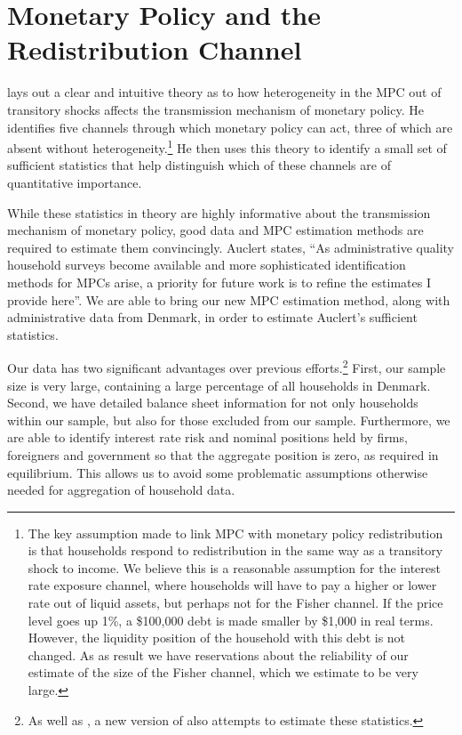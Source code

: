 \documentclass[titlepage]{\econtex}\newcommand{\texname}{ConsumptionHeterogeneity}
\begin{document}
\section{Monetary Policy and the Redistribution Channel} \label{monetary_policy}
\cite{auclert_monetary_2017} lays out a clear and intuitive theory as to how heterogeneity in the MPC out of transitory shocks affects the transmission mechanism of monetary policy. He identifies five channels through which monetary policy can act, three of which are absent without heterogeneity.\footnote{The key assumption made to link MPC with monetary policy redistribution is that households respond to redistribution in the same way as a transitory shock to income. We believe this is a reasonable assumption for the interest rate exposure channel, where households will have to pay a higher or lower rate out of liquid assets, but perhaps not for the Fisher channel. If the price level goes up 1\%, a \$100,000 debt is made smaller by \$1,000 in real terms. However, the liquidity position of the household with this debt is not changed. As as result we have reservations about the reliability of our estimate of the size of the Fisher channel, which we estimate to be very large.} He then uses this theory to identify a small set of sufficient statistics that help distinguish which of these channels are of quantitative importance.

While these statistics in theory are highly informative about the transmission mechanism of monetary policy, good data and MPC estimation methods are required to estimate them convincingly. Auclert states, ``As administrative quality household surveys become available and more sophisticated identification methods for MPCs arise, a priority for future work is to refine the estimates I provide here''. We are able to bring our new MPC estimation method, along with administrative data from Denmark, in order to estimate Auclert's sufficient statistics.

Our data has two significant advantages over previous efforts.\footnote{As well as \cite{auclert_monetary_2017}, a new version of \cite{fagereng_mpc_2016} also attempts to estimate these statistics.} First, our sample size is very large, containing a large percentage of all households in Denmark. Second, we have detailed balance sheet information for not only households within our sample, but also for those excluded from our sample. Furthermore, we are able to identify interest rate risk and nominal positions held by firms, foreigners and government so that the aggregate position is zero, as required in equilibrium. This allows us to avoid some problematic assumptions otherwise needed for aggregation of household data.
\end{document}
